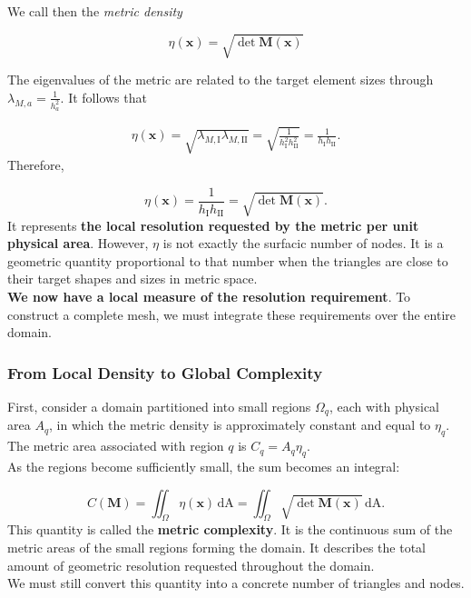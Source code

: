 \documentclass[11pt,a4paper]{article}
\begin{document}
\noindent
We call then the \emph{metric density}

\begin{equation}
\boxed{
\eta(\mathbf x)=\sqrt{\det\mathbf M(\mathbf x)}
}
\end{equation}


\noindent
The eigenvalues of the metric are related to the target element sizes through $\lambda_{M,a}=\frac{1}{h_a^2}$. It follows that

\begin{align*}
\eta(\mathbf x) =\sqrt{\lambda_{M,\mathrm I}\lambda_{M,\mathrm{II}}}=\sqrt{\frac{1}{h_{\mathrm I}^2h_{\mathrm{II}}^2}}=\frac{1}{h_{\mathrm I}h_{\mathrm{II}}}.
\end{align*}
\noindent
Therefore,

\begin{equation}
\boxed{
\eta(\mathbf x)
=\frac{1}{h_{\mathrm I}h_{\mathrm{II}}}
=\sqrt{\det\mathbf M(\mathbf x)}.
}
\end{equation}
\noindent
It represents \textbf{the local resolution requested by the metric per unit physical area}. However, $\eta$ is not exactly the surfacic number of nodes. It is a geometric quantity proportional to that number when the triangles are close to their target shapes and sizes in metric space.\\
\noindent
\textbf{We now have a local measure of the resolution requirement}. To construct a complete mesh, we must integrate these requirements over the entire domain.

\subsubsection{From Local Density to Global Complexity}
\noindent
First, consider a domain partitioned into small regions $\Omega_q$, each with physical area $A_q$, in which the metric density is approximately constant and equal to $\eta_q$. The metric area associated with region $q$ is $C_q=A_q\eta_q$. \\
\noindent
As the regions become sufficiently small, the sum becomes an integral:

\begin{equation}
\boxed{
C(\mathbf M)
=\iint_\Omega\eta(\mathbf x)\,\mathrm{dA}
=\iint_\Omega\sqrt{\det\mathbf M(\mathbf x)}\,\mathrm{dA}.
}
\end{equation}
\noindent
This quantity is called the \textbf{metric complexity}. It is the continuous sum of the metric areas of the small regions forming the domain. It describes the total amount of geometric resolution requested throughout the domain.\\
\noindent
We must still convert this quantity into a concrete number of triangles and nodes.
\end{document}

